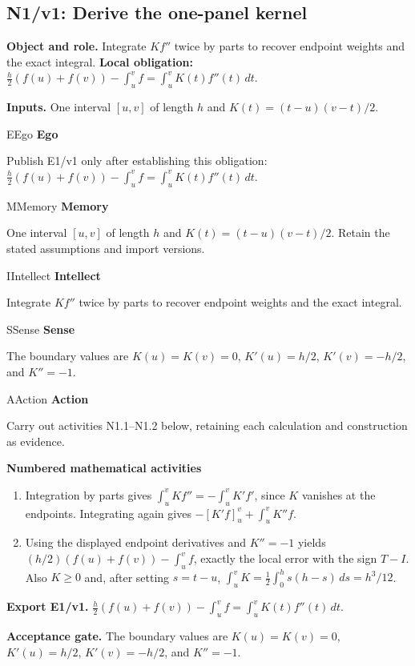 \documentclass[preprint,12pt,aps,pra,showkeys,amsmath,amssymb,superscriptaddress,floatfix]{revtex4-2}
\theoremstyle{definition}
\theoremstyle{remark}
\newcommand{\mmfaculty}[3]{%
 \begin{mmfacultybox}{#1}{#2}
 {\sffamily\bfseries\color{MMBlue}#2}\par\smallskip #3
 \end{mmfacultybox}}
\newcommand{\field}[2]{\par\smallskip\noindent\textbf{#1.} #2\par}
\begin{document}
\subsection{N1/v1: Derive the one-panel kernel}

\field{Object and role}{Integrate \(Kf''\) twice by parts to recover endpoint weights and the
exact integral. \textbf{Local obligation:}
\(\frac h2(f(u)+f(v))-\int_u^v f=\int_u^v K(t)f''(t)\,dt\).}

\field{Inputs}{One interval \([u,v]\) of length \(h\) and \(K(t)=(t-u)(v-t)/2\).}

\mmfaculty{E}{Ego}{Publish E1/v1 only after establishing this obligation:
\(\frac h2(f(u)+f(v))-\int_u^v f=\int_u^v K(t)f''(t)\,dt\).}

\mmfaculty{M}{Memory}{One interval \([u,v]\) of length \(h\) and \(K(t)=(t-u)(v-t)/2\). Retain
the stated assumptions and import versions.}

\mmfaculty{I}{Intellect}{Integrate \(Kf''\) twice by parts to recover endpoint weights and the
exact integral.}

\mmfaculty{S}{Sense}{The boundary values are \(K(u)=K(v)=0\), \(K'(u)=h/2\), \(K'(v)=-h/2\),
and \(K''=-1\).}

\mmfaculty{A}{Action}{Carry out activities N1.1--N1.2 below, retaining each calculation and
construction as evidence.}

\smallskip\noindent\textbf{Numbered mathematical activities}

\begin{enumerate}[label=N1.\arabic*,leftmargin=3.4em]

\item Integration by parts gives \(\int_u^v Kf''=-\int_u^v K'f'\), since \(K\)
vanishes at the endpoints. Integrating again gives
\(-[K'f]_u^v+\int_u^v K''f\).

\item Using the displayed endpoint derivatives and \(K''=-1\) yields
\((h/2)(f(u)+f(v))-\int_u^v f\), exactly the local error with the sign
\(T-I\). Also \(K\ge0\) and, after setting \(s=t-u\),
\(\int_u^v K=\frac12\int_0^h s(h-s)\,ds=h^3/12\).

\end{enumerate}

\field{Export E1/v1}{\(\frac h2(f(u)+f(v))-\int_u^v f=\int_u^v K(t)f''(t)\,dt\).}

\field{Acceptance gate}{The boundary values are \(K(u)=K(v)=0\), \(K'(u)=h/2\), \(K'(v)=-h/2\),
and \(K''=-1\).}
\end{document}
